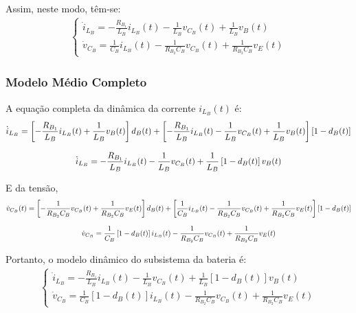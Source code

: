 \documentclass{article}
\newcommand{\nle}{%
  \notag \\[8pt]
}
\begin{document}
Assim, neste modo, têm-se:
\begin{gather}
  \begin{cases}
    \dot{i}_{L_B} = \displaystyle - \frac{R_{B_1}}{L_B} i_{L_B}(t) - \frac{1}{L_B} v_{C_B} (t) + \frac{1}{L_B} v_B(t) \\[8pt]
    \dot{v}_{C_B} = \displaystyle \frac{1}{C_B} i_{L_B}(t) - \frac{1}{R_{B_2}C_B} v_{C_B}(t) + \frac{1}{R_{B_2} C_B} v_E(t)
  \end{cases}
\end{gather}

\vspace*{8pt}
\subsubsection*{Modelo Médio Completo}
A equação completa da dinâmica da corrente ${i}_{L_B}(t)$ é:
\begin{gather}
  \dot{i}_{L_B} = \left[- \frac{R_{B_1}}{L_B} i_{L_B}(t) + \frac{1}{L_B} v_B(t)\right] d_B(t) + \left[- \frac{R_{B_1}}{L_B} i_{L_B}(t) - \frac{1}{L_B} v_{C_B} (t) + \frac{1}{L_B} v_B(t)\right] \left[1 - d_B(t)\right] \nle
  \dot{i}_{L_B} = - \frac{R_{B_1}}{L_B} i_{L_B}(t) - \frac{1}{L_B} v_{C_B} (t) + \frac{1}{L_B} \left[1 - d_B(t)\right] v_B(t)
\end{gather}

E da tensão,
\begin{gather}
  \dot{v}_{C_B}(t) = \left[- \frac{1}{R_{B_2} C_B} v_{C_B}(t) + \frac{1}{R_{B_2} C_B} v_{E}(t)\right] d_B(t) + \left[\frac{1}{C_B} i_{L_B}(t) - \frac{1}{R_{B_2}C_B} v_{C_B}(t) + \frac{1}{R_{B_2} C_B} v_E(t)\right] \left[1 - d_B(t)\right] \nle
  \dot{v}_{C_B} = \frac{1}{C_B} \left[1 - d_B(t)\right] i_{L_B}(t) - \frac{1}{R_{B_2}C_B} v_{C_B}(t) + \frac{1}{R_{B_2} C_B} v_E(t)
\end{gather}

Portanto, o modelo dinâmico do subsistema da bateria é:
\begin{gather}
  \begin{cases}
    \dot{i}_{L_B} = \displaystyle - \frac{R_{B_1}}{L_B} i_{L_B}(t) - \frac{1}{L_B} v_{C_B} (t) + \frac{1}{L_B} \left[1 - d_B(t)\right] v_B(t) \\[8pt]
    \dot{v}_{C_B} = \displaystyle \frac{1}{C_B} \left[1 - d_B(t)\right] i_{L_B}(t) - \frac{1}{R_{B_2}C_B} v_{C_B}(t) + \frac{1}{R_{B_2} C_B} v_E(t)
  \end{cases}
\end{gather}

\vspace*{8pt}
\end{document}
